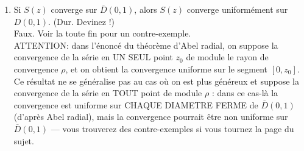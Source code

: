 \documentclass[a4paper,10pt]{article}
\newcommand{\correction}[1]{{\color{red}#1}}
\newcommand{\comment}[1]{{\color{blue}#1}}
\begin{document}
\begin{enumerate}[label=\alph*)]
    \item Si $S(z)$ converge sur $\overline{D}(0,1)$, alors $S(z)$ converge uniformément sur $D(0,1)$. (Dur. Devinez !) \\
    \correction{Faux. Voir la toute fin pour un contre-exemple.} \\
    \comment{ATTENTION: dans l'énoncé du théorème d'Abel radial, on suppose la convergence de la série en UN SEUL point $z_0$ de module le rayon de convergence $\rho$, et on obtient la convergence uniforme sur le segment $[0,z_0]$. Ce résultat ne se généralise pas au cas où on est plus généreux et suppose la convergence de la série en TOUT point de module $\rho$ : dans ce cas-là la convergence est uniforme sur CHAQUE DIAMETRE FERME de $\overline{D}(0,1)$ (d'après Abel radial), mais la convergence pourrait être non uniforme sur $\overline{D}(0,1)$ --- vous trouverez des contre-exemples si vous tournez la page du sujet.}
\end{enumerate}
\end{document}
